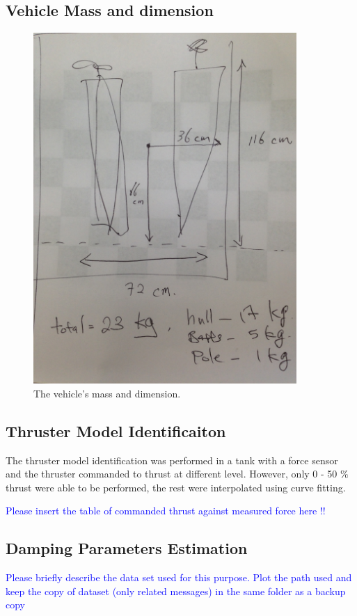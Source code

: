 \documentclass[]{article}
\newcommand{\todo}[1]{\textcolor{blue}{#1}}
\begin{document}
\subsection{Vehicle Mass and dimension}

\begin{figure}[H]
\centering
\includegraphics[width=10cm]{img/vec_dimension_mass.JPG}
\caption{The vehicle's mass and dimension.}
\label{fig:usv}
\end{figure} 

\subsection{Thruster Model Identificaiton}
The thruster model identification was performed in a tank with a force sensor and the thruster commanded to thrust at different level. However, only 0 - 50 $\%$ thrust were able to be performed, the rest were interpolated using curve fitting. 


\todo{Please insert the table of commanded thrust against measured force here !! }


\subsection{Damping Parameters Estimation}

\todo{Please briefly describe the data set used for this purpose. Plot the path used and keep the copy of dataset (only related messages) in the same folder as a backup copy}
\end{document}
